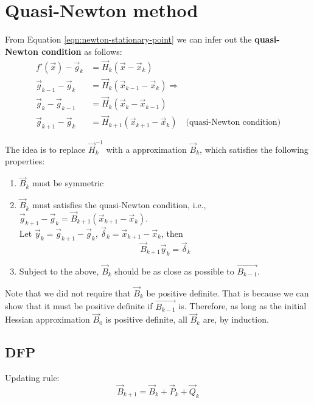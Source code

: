 \section{Quasi-Newton method}
\label{sec:Quasi-Newton-method}
From Equation \ref{eqn:newton-stationary-point} we can infer out the \textbf{quasi-Newton condition} as follows:
\begin{align}
f'(\vec{x})-\vec{g}_k & = \vec{H}_k(\vec{x}-\vec{x}_k) \nonumber \\
\vec{g}_{k-1}-\vec{g}_k & = \vec{H}_k(\vec{x}_{k-1}-\vec{x}_k) \Rightarrow \nonumber \\
\vec{g}_k- \vec{g}_{k-1} & = \vec{H}_k(\vec{x}_k-\vec{x}_{k-1}) \nonumber \\
\vec{g}_{k+1}- \vec{g}_k & = \vec{H}_{k+1}(\vec{x}_{k+1}-\vec{x}_k) \quad \text{(quasi-Newton condition)} \label{eqn:quasi-Newton-condition}
\end{align}

The idea is to replace $\vec{H}_k^{-1}$ with a approximation $\vec{B}_k$, which satisfies the following properties:
\begin{enumerate}
\item{$\vec{B}_k$ must be symmetric}
\item{$\vec{B}_k$ must satisfies the quasi-Newton condition, i.e., $\vec{g}_{k+1} - \vec{g}_k= \vec{B}_{k+1}(\vec{x}_{k+1}-\vec{x}_k)$. \\
Let $\vec{y}_k=\vec{g}_{k+1}- \vec{g}_k$, $\vec{\delta}_k=\vec{x}_{k+1}-\vec{x}_k$, then
\begin{equation}
\vec{B}_{k+1}\vec{y}_k=\vec{\delta}_k \label{eqn:secant-equation}
\end{equation}
}
\item{Subject to the above, $\vec{B}_k$ should be as close as possible to $\vec{B_{k-1}}$.}
\end{enumerate}

Note that we did not require that $\vec{B}_k$ be positive definite. That is because we can show that it must be 
positive definite if $\vec{B_{k-1}}$ is. Therefore, as long as the initial Hessian approximation $\vec{B}_0$ is positive definite, 
all $\vec{B}_k$ are, by induction. 


\subsection{DFP}
Updating rule:
\begin{equation}
\vec{B}_{k+1}=\vec{B}_k+\vec{P}_k+\vec{Q}_k
\end{equation}

